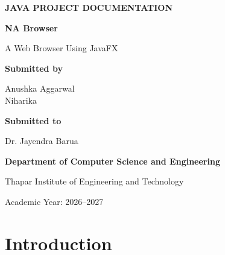 \documentclass[12pt,a4paper]{report}
\begin{document}
\begin{titlepage}
    \centering

    \vspace*{1cm}

    {\Large \textbf{JAVA PROJECT DOCUMENTATION}\par}

    \vspace{1.5cm}

    {\huge \textbf{NA Browser}\par}

    \vspace{0.5cm}

    {\Large A Web Browser Using JavaFX\par}

    \vspace{2cm}

    {\large \textbf{Submitted by}\par}

    \vspace{0.5cm}

    Anushka Aggarwal\\
    Niharika

    \vspace{1.5cm}

    {\large \textbf{Submitted to}\par}

    \vspace{0.5cm}

    Dr. Jayendra Barua

    \vspace{1.5cm}

    {\large \textbf{Department of Computer Science and Engineering}\par}

    \vspace{0.3cm}

    Thapar Institute of Engineering and Technology

    \vfill

    Academic Year: 2026--2027

\end{titlepage}

\tableofcontents
\clearpage
{}

\chapter{Introduction}
\end{document}
